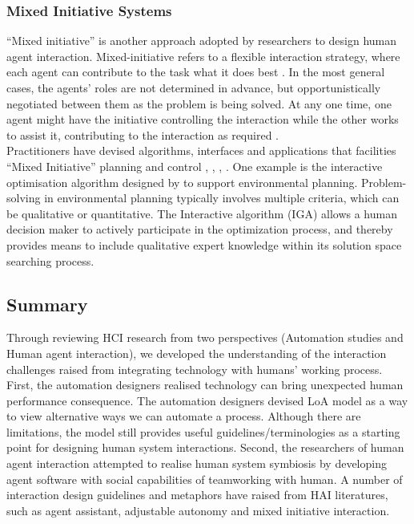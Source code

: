 \subsubsection{Mixed Initiative Systems}
``Mixed initiative'' is another approach adopted by researchers to design human agent interaction.  Mixed-initiative refers to a flexible interaction strategy, where each agent can contribute to the task what it does best \cite{Allen1999}. In the most general cases, the agents' roles are not determined in advance, but opportunistically negotiated between them as the problem is being solved. At any one time, one agent might have the initiative controlling the interaction while the other works to assist it, contributing to the interaction as required \cite{Horvitz1999}.\\

Practitioners have devised algorithms, interfaces and applications that facilities ``Mixed Initiative'' planning and control \cite{Ferguson1996}, \cite{Burstein2003}, \cite{Hardin2009}, \cite{Zimmerman2007} . One example is the interactive optimisation algorithm designed by \cite{Yang2012} to support environmental planning. Problem-solving in environmental planning typically involves multiple criteria, which can be qualitative or quantitative. The Interactive algorithm (IGA) allows a human decision maker to actively participate in the optimization process, and thereby provides means to include qualitative expert knowledge within its solution space searching process.\\


\subsection{Summary}
Through reviewing \ac{HCI} research from two perspectives (Automation studies and Human agent interaction), we developed the understanding of the interaction challenges raised from integrating technology with humans' working process.  First, the automation designers realised technology can bring unexpected human performance consequence. The automation designers devised \ac{LoA} model as a way to view alternative ways we can automate a process. Although there are limitations, the model still provides useful guidelines/terminologies as a starting point for designing human system interactions. Second, the researchers of human agent interaction attempted to realise human system symbiosis by developing agent software with social capabilities of teamworking with human. A number of interaction design guidelines and metaphors have raised from \ac{HAI} literatures, such as agent assistant, adjustable autonomy and mixed initiative interaction.  \\ 


